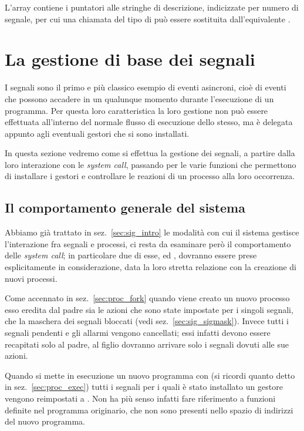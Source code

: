 L'array  contiene i puntatori alle stringhe di descrizione,
indicizzate per numero di segnale, per cui una chiamata del tipo di  può essere sostituita dall'equivalente .



\section{La gestione di base dei segnali}
\label{sec:sig_management}

I segnali sono il primo e più classico esempio di eventi asincroni, cioè di
eventi che possono accadere in un qualunque momento durante l'esecuzione di un
programma. Per questa loro caratteristica la loro gestione non può essere
effettuata all'interno del normale flusso di esecuzione dello stesso, ma è
delegata appunto agli eventuali gestori che si sono installati.

In questa sezione vedremo come si effettua la gestione dei segnali, a partire
dalla loro interazione con le \textit{system call}, passando per le varie
funzioni che permettono di installare i gestori e controllare le reazioni di
un processo alla loro occorrenza.


\subsection{Il comportamento generale del sistema}
\label{sec:sig_gen_beha}

Abbiamo già trattato in sez.~\ref{sec:sig_intro} le modalità con cui il
sistema gestisce l'interazione fra segnali e processi, ci resta da esaminare
però il comportamento delle \textit{system call}; in particolare due di esse,
 ed , dovranno essere prese esplicitamente in
considerazione, data la loro stretta relazione con la creazione di nuovi
processi.

Come accennato in sez.~\ref{sec:proc_fork} quando viene creato un nuovo
processo esso eredita dal padre sia le azioni che sono state impostate per i
singoli segnali, che la maschera dei segnali bloccati (vedi
sez.~\ref{sec:sig_sigmask}).  Invece tutti i segnali pendenti e gli allarmi
vengono cancellati; essi infatti devono essere recapitati solo al padre, al
figlio dovranno arrivare solo i segnali dovuti alle sue azioni.

Quando si mette in esecuzione un nuovo programma con  (si ricordi
quanto detto in sez.~\ref{sec:proc_exec}) tutti i segnali per i quali è stato
installato un gestore vengono reimpostati a . Non ha più
senso infatti fare riferimento a funzioni definite nel programma originario,
che non sono presenti nello spazio di indirizzi del nuovo programma.

